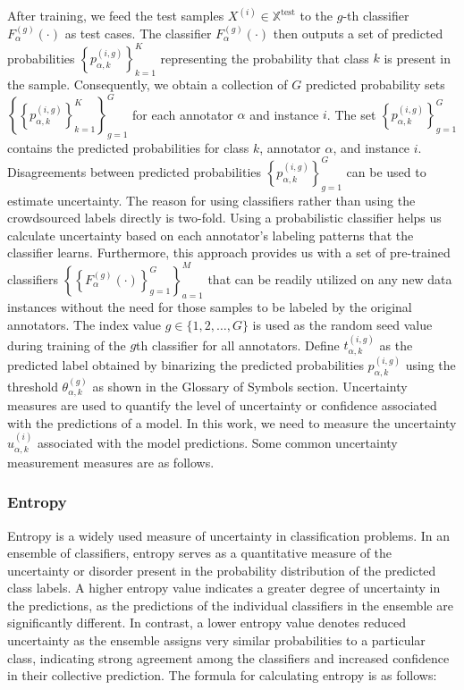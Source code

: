 \documentclass[pdflatex,bst/sn-basic]{bst/sn-jnl}%
\begin{document}
After training, we feed the test samples $X^{(i)}\in \mathbb{X}^{\text{test}} $ to the $g $-th classifier $F_{\alpha}^{(g)}(\cdot) $ as test cases. The classifier $F_{\alpha}^{(g)}(\cdot) $ then outputs a set of predicted probabilities $\left\{p_{\alpha,k}^{(i,g)}\right\}_{k=1}^{K} $ representing the probability that class $k $ is present in the sample. Consequently, we obtain a collection of $G $ predicted probability sets $\left\{ \left\{ p_{\alpha,k}^{(i,g)}\right\}_{k=1}^K \right\}_{g=1}^G $ for each annotator $\alpha $ and instance $i $. The set $\left\{p_{\alpha,k}^{(i,g)}\right\}_{g=1}^G $ contains the predicted probabilities for class $k $, annotator $\alpha $, and instance $i $. Disagreements between predicted probabilities $\left\{p_{\alpha,k}^{(i,g)}\right\}_{g=1}^G $ can be used to estimate uncertainty.
The reason for using classifiers rather than using the crowdsourced labels directly is two-fold. Using a probabilistic classifier helps us calculate uncertainty based on each annotator's labeling patterns that the classifier learns. Furthermore, this approach provides us with a set of pre-trained classifiers $\left\{ \left\{ F_{\alpha}^{(g)}(\cdot) \right\}_{g=1}^G  \right\}_{a=1}^{M} $ that can be readily utilized on any new data instances without the need for those samples to be labeled by the original annotators.
The index value $g  \in \{1,2,\dots,G\} $ is used as the random seed value during training of the $g$\-th classifier for all annotators.
Define $t_{\alpha,k}^{(i,g)} $ as the predicted label obtained by binarizing the predicted probabilities $p_{\alpha,k}^{ (i,g)} $ using the threshold $\theta_{\alpha,k}^{(g)} $ as shown in the Glossary of Symbols section.
Uncertainty measures are used to quantify the level of uncertainty or confidence associated with the predictions of a model. In this work, we need to measure the uncertainty $u_{\alpha,k}^{(i)}$ associated with the model predictions. Some common uncertainty measurement measures are as follows.

\subsubsection{Entropy}
Entropy is a widely used measure of uncertainty in classification problems. In an ensemble of classifiers, entropy serves as a quantitative measure of the uncertainty or disorder present in the probability distribution of the predicted class labels. A higher entropy value indicates a greater degree of uncertainty in the predictions, as the predictions of the individual classifiers in the ensemble are significantly different. In contrast, a lower entropy value denotes reduced uncertainty as the ensemble assigns very similar probabilities to a particular class, indicating strong agreement among the classifiers and increased confidence in their collective prediction. The formula for calculating entropy is as follows:
\end{document}
